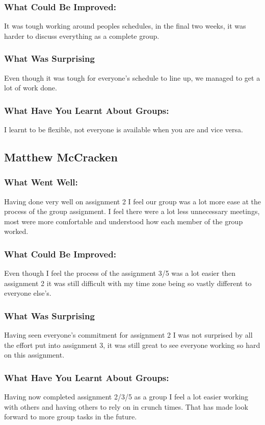 \documentclass[11pt, oneside, a4paper, titlepage]{article}
\begin{document}
\subsubsection{What Could Be Improved:}
It was tough working around peoples schedules, in the final two weeks, it was harder to discuss everything as a complete group. 

\subsubsection{What Was Surprising}
Even though it was tough for everyone's schedule to line up, we managed to get a lot of work done. 

\subsubsection{What Have You Learnt About Groups:}
I learnt to be flexible, not everyone is available when you are and vice versa. 

\subsection{Matthew McCracken}
\subsubsection{What Went Well:}
Having done very well on assignment 2 I feel our group was a lot more ease at the process of the group assignment. I feel there were a lot less unnecessary meetings, most were more comfortable and understood how each member of the group worked. 

\subsubsection{What Could Be Improved:}
Even though I feel the process of the assignment 3/5 was a lot easier then assignment 2 it was still difficult with my time zone being so vastly different to everyone else’s.

\subsubsection{What Was Surprising}
Having seen everyone’s commitment for assignment 2 I was not surprised by all the effort put into assignment 3, it was still great to see everyone working so hard on this assignment.

\subsubsection{What Have You Learnt About Groups:}
Having now completed assignment 2/3/5 as a group I feel a lot easier working with others and having others to rely on in crunch times. That has made look forward to more group tasks in the future.
\end{document}
